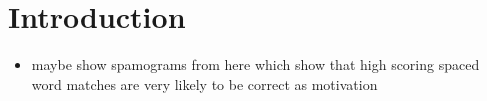 \chapter{Introduction}


\begin{itemize}
	\item maybe show spamograms from \cite{hundt2020praktkium} here which show that high scoring spaced word matches are very likely to be correct as motivation
\end{itemize}